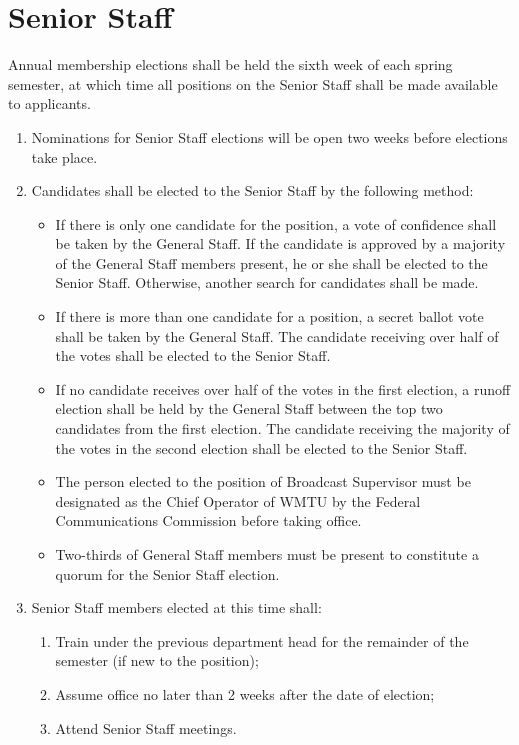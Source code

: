 \documentclass[12pt]{constitution}
\begin{document}
\section{​Senior Staff}
Annual membership elections shall be held the sixth week of each spring semester, at which time all positions on the Senior Staff shall be made available to applicants.
\begin{enumerate}
\item Nominations for Senior Staff elections will be open two weeks before elections take place.
\item Candidates shall be elected to the Senior Staff by the following method:
\begin{itemize}
\item If there is only one candidate for the position, a vote of confidence shall be taken by the General Staff. If the candidate is approved by a majority of the General Staff members present, he or she shall be elected to the Senior Staff. Otherwise, another search for candidates shall be made.
\item If there is more than one candidate for a position, a secret ballot vote shall be taken by the General Staff. The candidate receiving over half of the votes shall be elected to the Senior Staff.
\item If no candidate receives over half of the votes in the first election, a runoff election shall be held by the General Staff between the top two candidates from the first election. The candidate receiving the majority of the votes in the second election shall be elected to the Senior Staff.
\item The person elected to the position of Broadcast Supervisor must be designated as the Chief Operator of WMTU by the Federal Communications Commission before taking office.
\item Two-­thirds of General Staff members must be present to constitute a quorum for the Senior Staff election.
\end{itemize}
\item Senior Staff members elected at this time shall:
\begin{enumerate}
\item Train under the previous department head for the remainder of the semester (if new to the position);
\item Assume office no later than 2 weeks after the date of election;
\item Attend Senior Staff meetings.
\end{enumerate}
\end{enumerate}
\end{document}
